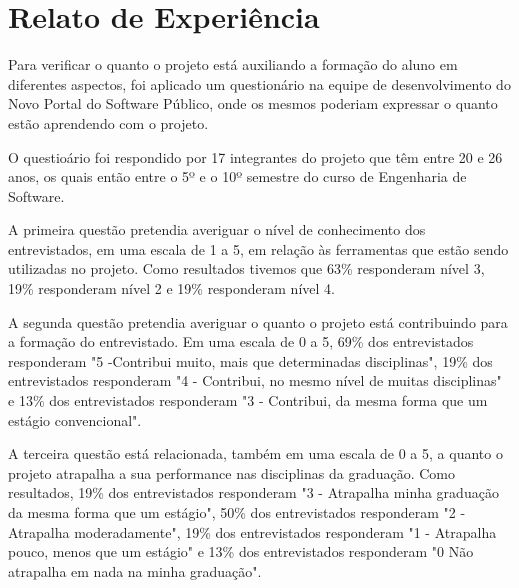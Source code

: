 \section{Relato de Experiência}
\label{sec:relato}

Para verificar o quanto o projeto está auxiliando a formação do aluno em diferentes
aspectos, foi aplicado um questionário na equipe de desenvolvimento do Novo Portal 
do Software Público, onde os mesmos poderiam expressar o quanto estão aprendendo 
com o projeto.

O questioário foi respondido por 17 integrantes do projeto que têm entre 20 e 26 anos, os quais então entre o 5º e o 10º semestre do curso de Engenharia de Software.

A primeira questão pretendia averiguar o nível de conhecimento dos entrevistados, em uma escala de 1 a 5, em relação às ferramentas que estão sendo utilizadas no projeto. Como resultados tivemos que 63\% responderam nível 3, 19\% responderam nível 2 e 19\% responderam nível 4.

A segunda questão pretendia averiguar o quanto o projeto está contribuindo para a formação do entrevistado. Em uma escala de 0 a 5, 69\% dos entrevistados responderam "5 -Contribui muito, mais que determinadas disciplinas", 19\% dos entrevistados responderam "4 - Contribui, no mesmo nível de muitas disciplinas" e 13\% dos entrevistados responderam "3 - Contribui, da mesma forma que um estágio convencional".


A terceira questão está relacionada, também em uma escala de 0 a 5, a quanto o projeto atrapalha a sua performance nas disciplinas da graduação. Como resultados, 19\% dos entrevistados responderam "3 - Atrapalha minha graduação da mesma forma que um estágio", 50\% dos entrevistados responderam "2 - Atrapalha moderadamente", 19\% dos entrevistados responderam "1 - Atrapalha pouco, menos que um estágio" e 13\% dos entrevistados responderam "0  Não atrapalha em nada na minha graduação".


